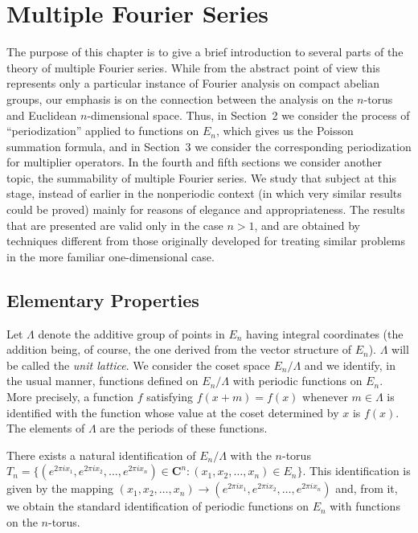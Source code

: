 \chapter{Multiple Fourier Series}
\label{ch:multiple-fourier}

The purpose of this chapter is to give a brief introduction to several parts of the theory of multiple Fourier series. While from the abstract point of view this represents only a particular instance of Fourier analysis on compact abelian groups, our emphasis is on the connection between the analysis on the $n$-torus and Euclidean $n$-dimensional space. Thus, in Section~2 we consider the process of ``periodization'' applied to functions on $E_n$, which gives us the Poisson summation formula, and in Section~3 we consider the corresponding periodization for multiplier operators. In the fourth and fifth sections we consider another topic, the summability of multiple Fourier series. We study that subject at this stage, instead of earlier in the nonperiodic context (in which very similar results could be proved) mainly for reasons of elegance and appropriateness. The results that are presented are valid only in the case $n > 1$, and are obtained by techniques different from those originally developed for treating similar problems in the more familiar one-dimensional case.

\section{Elementary Properties}

Let $\Lambda$ denote the additive group of points in $E_n$ having integral coordinates (the addition being, of course, the one derived from the vector structure of $E_n$). $\Lambda$ will be called the \emph{unit lattice}. We consider the coset space $E_n/\Lambda$ and we identify, in the usual manner, functions defined on $E_n/\Lambda$ with periodic functions on $E_n$. More precisely, a function $f$ satisfying $f(x + m) = f(x)$ whenever $m \in \Lambda$ is identified with the function whose value at the coset determined by $x$ is $f(x)$. The elements of $\Lambda$ are the periods of these functions.

There exists a natural identification of $E_n/\Lambda$ with the $n$-torus $T_n = \{(e^{2\pi i x_1}, e^{2\pi i x_2}, \dots, e^{2\pi i x_n}) \in \mathbf{C}^n : (x_1, x_2, \dots, x_n) \in E_n\}$. This identification is given by the mapping $(x_1, x_2, \dots, x_n) \to (e^{2\pi i x_1}, e^{2\pi i x_2}, \dots, e^{2\pi i x_n})$ and, from it, we obtain the standard identification of periodic functions on $E_n$ with functions on the $n$-torus.

